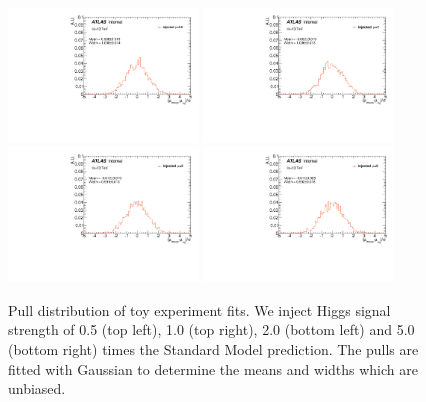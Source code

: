 \begin{figure}[htbp]
  \centering
 \includegraphics[width=0.45\textwidth]{figures/VBF/Mu05.pdf}
 \includegraphics[width=0.45\textwidth]{figures/VBF/Mu1.pdf}\\
 \includegraphics[width=0.45\textwidth]{figures/VBF/Mu2.pdf}
 \includegraphics[width=0.45\textwidth]{figures/VBF/Mu5.pdf}\\
\caption{Pull distribution of toy experiment fits. We inject Higgs signal strength of 0.5 (top left), 1.0 (top right), 2.0 (bottom left) and 5.0 (bottom right) times the Standard Model prediction. The pulls are fitted with Gaussian to determine the means and widths which are unbiased. }
  \label{fig:MCToy}
\end{figure}

